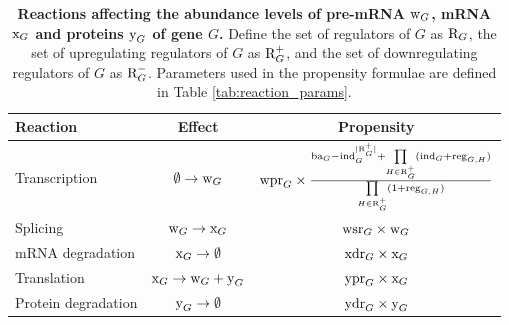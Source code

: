 \begin{table}[h]
	\caption{\textbf{Reactions affecting the abundance levels of pre-mRNA $\text{w}_{G}$, mRNA $\text{x}_{G}$ and proteins $\text{y}_{G}$ of gene $G$.} Define the set of regulators of $G$ as $\text{R}_{G}$, the set of upregulating regulators of $G$ as $\text{R}^+_{G}$, and the set of downregulating regulators of $G$ as $\text{R}^-_{G}$. Parameters used in the propensity formulae are defined in Table \ref{tab:reaction_params}.} \label{tab:reaction_def}
	\centering
	\begin{tabular}{|lcc|}
		\hline
		Reaction & Effect & Propensity \\ \hline \hline
		Transcription & $\emptyset \rightarrow \text{w}_{G}$ & $\text{wpr}_{G} \times \frac{\text{ba}_{G} - \text{ind}_{G}^{|\text{R}^+_{G}|} + \prod\limits_{H \in \text{R}^+_{G}}(\text{ind}_{G} + \text{reg}_{G,H})}{\prod\limits_{H \in \text{R}^+_{G}}(1 + \text{reg}_{G,H})}$ \\
		Splicing & $\text{w}_{G} \rightarrow \text{x}_{G}$ & $\text{wsr}_{G} \times \text{w}_{G}$ \\
		mRNA degradation & $\text{x}_{G} \rightarrow \emptyset$ & $\text{xdr}_{G} \times \text{x}_{G}$ \\
		Translation & $\text{x}_{G} \rightarrow \text{w}_{G} + \text{y}_{G}$ & $\text{ypr}_{G} \times \text{x}_{G}$ \\
		Protein degradation & $\text{y}_{G} \rightarrow \emptyset$ & $\text{ydr}_{G} \times \text{y}_{G}$ \\ \hline
	\end{tabular}
\end{table}



